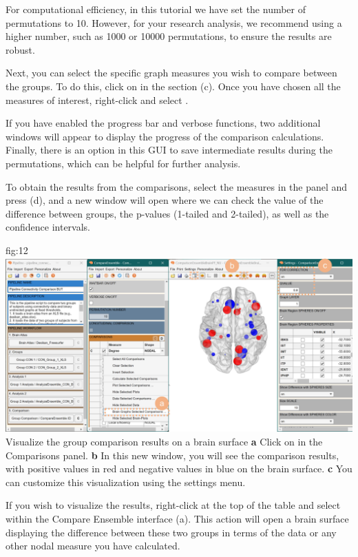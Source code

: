 \documentclass[justified]{tufte-handout}
\begin{document}
For computational efficiency, in this tutorial we have set the number of permutations to 10. However, for your research analysis, we recommend using a higher number, such as 1000 or 10000 permutations, to ensure the results are robust.

Next, you can select the specific graph measures you wish to compare between the groups. To do this, click on  in the  section (c). Once you have chosen all the measures of interest, right-click and select .

If you have enabled the progress bar and verbose functions, two additional windows will appear to display the progress of the comparison calculations. Finally, there is an option in this GUI to save intermediate results during the permutations, which can be helpful for further analysis.
 
To obtain the results from the comparisons, select the measures in the  panel and press ({d}), and a new window will open where we can check the value of the difference between groups, the p-values (1-tailed and 2-tailed), as well as the confidence intervals.

	{fig:12}
	{
	\includegraphics{fig12.jpg}
	}
	{Visualize the group comparison results on a brain surface}
	{
	{\bf a} Click on  in the Comparisons panel.
	{\bf b} In this new window, you will see the comparison results, with positive values in red and negative values in blue on the brain surface.
{\bf c} You can customize this visualization using the settings menu.
	}

If you wish to visualize the results, right-click at the top of the table and select  within the Compare Ensemble interface (a). This action will open a brain surface displaying the difference between these two groups in terms of the  data or any other nodal measure you have calculated.
\end{document}
